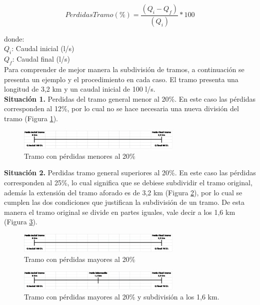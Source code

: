 \documentclass[]{article}
\begin{document}
\begin{equation}
Perdidas Tramo (\%)=\frac{(Q_i - Q_f)}{(Q_i)}*100
\end{equation}

donde:\\
$Q_i$: Caudal inicial (l/s)\\
$Q_f$: Caudal final (l/s)\\

Para comprender de mejor manera la subdivisión de tramos, a continuación se presenta un ejemplo y el procedimiento en cada caso. El tramo presenta una longitud de 3,2 km y un caudal inicial de 100 l/s.\\

\textbf{Situación 1.} Perdidas del tramo general menor al 20\%. En este caso las pérdidas corresponden al 12\%, por lo cual no se hace necesaria una nueva división del tramo (Figura \ref{sit_1}).

\begin{figure}[H]
\centering
\includegraphics[width=0.7\textwidth]{images/sit_1.eps}
\caption{Tramo con pérdidas menores al 20\%}
\label{sit_1}
\end{figure}

\textbf{Situación 2.} Perdidas tramo general superiores al 20\%. En este caso las pérdidas corresponden al 25\%, lo cual significa que se debiese subdividir el tramo original, además la extensión del tramo aforado es de 3,2 km (Figura \ref{sit_2}), por lo cual se cumplen las dos condiciones que justifican la subdivisión de un tramo. De esta manera el tramo original se divide en partes iguales, vale decir a los 1,6 km (Figura \ref{sit_2_1}).

\begin{figure}[H]
\centering
\includegraphics[width=0.7\textwidth]{images/sit_2.eps}
\caption{Tramo con pérdidas mayores al 20\%}
\label{sit_2}
\end{figure}

\begin{figure}[H]
\centering
\includegraphics[width=0.7\textwidth]{images/sit_2_1.eps}
\caption{Tramo con pérdidas mayores al 20\% y subdivisión a los 1,6 km.}
\label{sit_2_1}
\end{figure}
\end{document}
